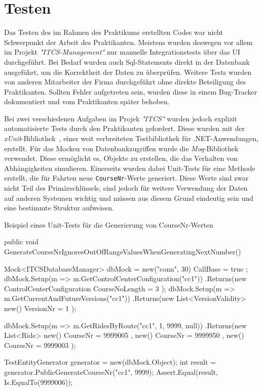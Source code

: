 \chapter{Testen}\label{chap:testen}
    Das Testen des im Rahmen des Praktikums erstellten Codes war nicht Schwerpunkt der Arbeit des Praktikanten. Meistens wurden deswegen vor allem im Projekt \emph{"ITCS-Management"} nur 
    manuelle Integrationstests über das UI durchgeführt. Bei Bedarf wurden auch Sql-Statements direkt in der Datenbank ausgeführt, um die Korrektheit der Daten zu überprüfen. 
    Weitere Tests wurden von anderen  Mitarbeiter der Firma durchgeführt ohne direkte Beteiligung des Praktikanten. Sollten 
    Fehler aufgetreten sein, wurden diese in einem Bug-Tracker dokumentiert und vom Praktikanten später behoben.

    Bei zwei verschiedenen Aufgaben im Projek \emph{"ITCS"} wurden jedoch explizit automatisierte Tests durch den Praktikanten gefordert.
    Diese wurden mit der \emph{xUnit}-Bibliothek~\cite{xunit}, einer weit verbreiteten Testbibliothek für .NET-Anwendungen, erstellt.
    Für das Mocken von Datenbankzugriffen wurde die \emph{Moq}-Bibliothek~\cite{moq} verwendet. Diese ermöglicht es, Objekte zu erstellen, die das Verhalten von Abhängigkeiten simulieren.
    Einerseits wurden dabei Unit-Tests für eine Methode erstellt, die für Fahrten neue \texttt{CourseNr}-Werte generiert. Diese Werte sind zwar nicht Teil des Primärschlüssels, sind jedoch 
    für weitere Verwendung der Daten auf anderen Systemen wichtig und müssen aus diesem Grund eindeutig sein und eine bestimmte Struktur aufweisen. 

    \begin{program} [H]
        \caption{Beispiel eines Unit-Tests für die Generierung von CourseNr-Werten}
        \label{prog:UnitTest}
    \begin{CsCode}[numbers=left]
[Fact]
public void GenerateCourseNrIgnoresOutOfRangeValuesWhenGeneratingNextNumber()
{
    Mock<ITCSDatabaseManager> dbMock = new("conn", 30) { CallBase = true };
    dbMock.Setup(m => m.GetControlCenterConfiguration("cc1"))
        .Returns(new ControlCenterConfiguration { CourseNoLength = 3 });
    dbMock.Setup(m => m.GetCurrentAndFutureVersions("cc1"))
        .Returns(new List<VersionValidity> { new() { VersionNr = 1 } });

    dbMock.Setup(m => m.GetRidesByRoute("cc1", 1, 9999, null))
        .Returns(new List<Ride> {
            new() { CourseNr = 9999005 },
            new() { CourseNr = 9999950 },
            new() { CourseNr = 9999003 }
        });

    TestEntityGenerator generator = new(dbMock.Object);
    int result = generator.PublicGenerateCourseNr("cc1", 9999);
    Assert.Equal(result, Is.EqualTo(9999006));
}\end{CsCode}
    \end{program}

